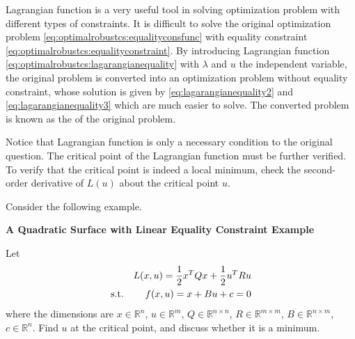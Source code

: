 Lagrangian function is a very useful tool in solving optimization problem with different types of constraints. It is difficult to solve the original optimization problem \eqref{eq:optimalrobustcs:equalityconsfunc} with equality constraint \eqref{eq:optimalrobustcs:equalityconstraint}. By introducing Lagrangian function \eqref{eq:optimalrobustcs:lagarangianequality} with $\lambda$ and $u$ the independent variable, the original problem is converted into an optimization problem without equality constraint, whose solution is given by \eqref{eq:lagarangianequality2} and \eqref{eq:lagarangianequality3} which are much easier to solve. The converted problem is known as the  of the original problem. 

Notice that Lagrangian function is only a necessary condition to the original question. The critical point of the Lagrangian function must be further verified. To verify that the critical point is indeed a local minimum, check the second-order derivative of $L(u)$ about the critical point $u$.

Consider the following example.
\begin{mdframed}
\noindent \textbf{A Quadratic Surface with Linear Equality Constraint Example}

Let
\begin{eqnarray}
	&& L(x, u) = \dfrac{1}{2}x^TQx + \dfrac{1}{2}u^TRu \label{eq:optimalrobustcs:quadraticsurfexp1} \\
	\textup{s.t.} && f(x, u) = x + Bu + c = 0 \nonumber
\end{eqnarray}
where the dimensions are $x\in\mathbb{R}^n$, $u\in\mathbb{R}^m$, $Q\in\mathbb{R}^{n\times n}$, $R\in\mathbb{R}^{m\times m}$, $B\in\mathbb{R}^{n\times m}$, $c\in\mathbb{R}^n$. Find $u$ at the critical point, and discuss whether it is a minimum.

\end{mdframed}

